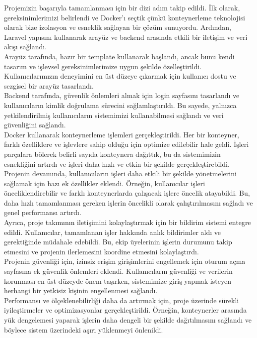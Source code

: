 Projemizin başarıyla tamamlanması için bir dizi adım takip edildi. İlk olarak, gereksinimlerimizi belirlendi ve Docker'ı seçtik çünkü konteynerleme teknolojisi olarak bize izolasyon ve esneklik sağlayan bir çözüm sunuyordu. Ardından, Laravel  yapısını kullanarak arayüz ve backend arasında etkili bir iletişim ve veri akışı sağlandı.\\
Arayüz tarafında, hazır bir template kullanarak başlandı, ancak bunu kendi tasarım ve işlevsel gereksinimlerimize uygun şekilde özelleştirildi. Kullanıcılarımızın deneyimini en üst düzeye çıkarmak için kullanıcı dostu ve sezgisel bir arayüz tasarlandı.\\
Backend tarafında, güvenlik önlemleri almak için login sayfasını tasarlandı ve kullanıcıların kimlik doğrulama sürecini sağlamlaştırıldı. Bu sayede, yalnızca yetkilendirilmiş kullanıcıların sistemimizi kullanabilmesi sağlandı ve veri güvenliğini sağlandı.\\
Docker kullanarak konteynerleme işlemleri gerçekleştirildi. Her bir konteyner, farklı özelliklere ve işlevlere sahip olduğu için optimize edilebilir hale geldi. İşleri parçalara bölerek belirli sayıda konteynera dağıttık, bu da sistemimizin esnekliğini artırdı ve işleri daha hızlı ve etkin bir şekilde gerçekleştirebildi.\\
Projenin devamında, kullanıcıların işleri daha etkili bir şekilde yönetmelerini sağlamak için bazı ek özellikler eklendi. Örneğin, kullanıcılar işleri önceliklendirebilir ve farklı konteynerlarda çalışacak işlere öncelik atayabildi. Bu, daha hızlı tamamlanması gereken işlerin öncelikli olarak çalıştırılmasını sağladı ve genel performansı artırdı.\\
Ayrıca, proje takımının iletişimini kolaylaştırmak için bir bildirim sistemi entegre edildi. Kullanıcılar, tamamlanan işler hakkında anlık bildirimler aldı ve gerektiğinde müdahale edebildi. Bu, ekip üyelerinin işlerin durumunu takip etmesini ve projenin ilerlemesini koordine etmesini kolaylaştırdı.\\
Projenin güvenliği için, izinsiz erişim girişimlerini engellemek için oturum açma sayfasına ek güvenlik önlemleri eklendi. Kullanıcıların güvenliği ve verilerin korunması en üst düzeyde önem taşırken, sistemimize giriş yapmak isteyen herhangi bir yetkisiz kişinin engellenmesi sağlandı.\\
Performansı ve ölçeklenebilirliği daha da artırmak için, proje üzerinde sürekli iyileştirmeler ve optimizasyonlar gerçekleştirildi. Örneğin, konteynerler arasında yük dengelemesi yaparak işlerin daha dengeli bir şekilde dağıtılmasını sağlandı ve böylece sistem üzerindeki aşırı yüklenmeyi önlenildi.\\
